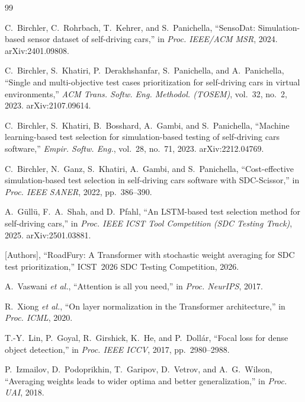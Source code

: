 \begin{thebibliography}{99}\small

 C.~Birchler, C.~Rohrbach, T.~Kehrer, and S.~Panichella,
``SensoDat: Simulation-based sensor dataset of self-driving cars,'' in
\textit{Proc. IEEE/ACM MSR}, 2024. arXiv:2401.09808.

 C.~Birchler, S.~Khatiri, P.~Derakhshanfar, S.~Panichella, and
A.~Panichella, ``Single and multi-objective test cases prioritization for
self-driving cars in virtual environments,'' \textit{ACM Trans. Softw. Eng.
Methodol. (TOSEM)}, vol.~32, no.~2, 2023. arXiv:2107.09614.

 C.~Birchler, S.~Khatiri, B.~Bosshard, A.~Gambi, and
S.~Panichella, ``Machine learning-based test selection for simulation-based
testing of self-driving cars software,'' \textit{Empir. Softw. Eng.}, vol.~28,
no.~71, 2023. arXiv:2212.04769.

 C.~Birchler, N.~Ganz, S.~Khatiri, A.~Gambi, and S.~Panichella,
``Cost-effective simulation-based test selection in self-driving cars software
with SDC-Scissor,'' in \textit{Proc. IEEE SANER}, 2022, pp.~386--390.

 A.~G\"{u}ll\"{u}, F.~A.~Shah, and D.~Pfahl, ``An LSTM-based
test selection method for self-driving cars,'' in \textit{Proc. IEEE ICST Tool
Competition (SDC Testing Track)}, 2025. arXiv:2501.03881.

 [Authors], ``RoadFury: A Transformer with stochastic weight
averaging for SDC test prioritization,'' ICST~2026 SDC Testing Competition,
2026.

 A.~Vaswani \textit{et al.}, ``Attention is all you
need,'' in \textit{Proc. NeurIPS}, 2017.

 R.~Xiong \textit{et al.}, ``On layer normalization in the
Transformer architecture,'' in \textit{Proc. ICML}, 2020.

 T.-Y.~Lin, P.~Goyal, R.~Girshick, K.~He, and P.~Doll\'{a}r,
``Focal loss for dense object detection,'' in \textit{Proc. IEEE ICCV}, 2017,
pp.~2980--2988.

 P.~Izmailov, D.~Podoprikhin, T.~Garipov, D.~Vetrov, and
A.~G.~Wilson, ``Averaging weights leads to wider optima and better
generalization,'' in \textit{Proc. UAI}, 2018.


\end{thebibliography}
